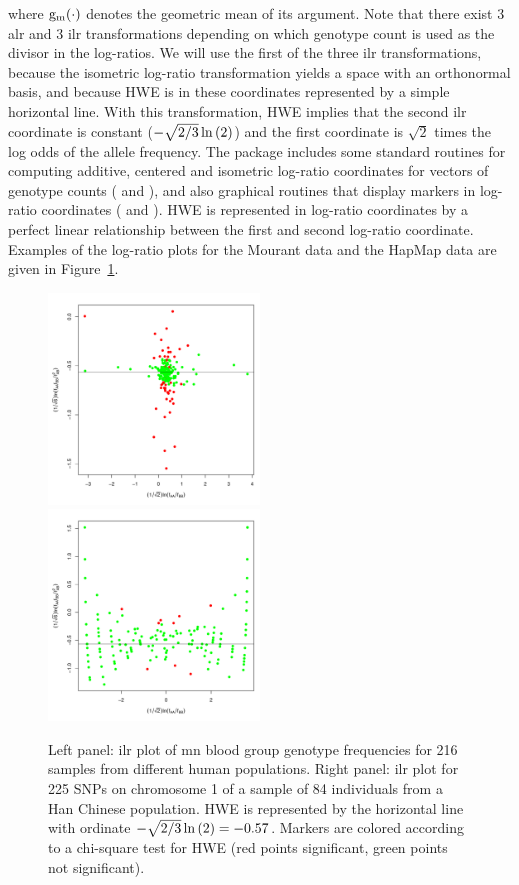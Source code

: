 \documentclass[nojss]{jss}
\begin{document}
where ${\mathrm{g_m}}(\cdot)$ denotes the geometric mean of its argument. Note
that there exist 3 alr and 3 ilr transformations depending on which
genotype count is used as the divisor in the log-ratios. We will use
the first of the three ilr transformations, because the isometric
log-ratio transformation yields a space with an orthonormal basis, and
because HWE is in these coordinates represented by a simple horizontal
line. With this transformation, HWE implies that the second ilr
coordinate is constant ($-\sqrt{2/3} \ln \left( 2 \right)$) and the first
coordinate is $\sqrt{2}$ times the log odds of the allele frequency.
The package includes some standard routines for computing additive,
centered and isometric log-ratio coordinates for vectors of genotype
counts ( and ), and also graphical
routines that display markers in log-ratio coordinates
( and ).  HWE is
represented in log-ratio coordinates by a perfect linear relationship
between the first and second log-ratio coordinate. Examples of the
log-ratio plots for the Mourant data and the HapMap data are given in
Figure~\ref{fig:logratio}.

\begin{figure}[t!]
\centering
\includegraphics[width=0.5\textwidth, trim=0 10 0 20, clip]{HWHapMapIlr1.pdf}%
\includegraphics[width=0.5\textwidth, trim=0 10 0 20, clip]{HWHapMapIlr2.pdf}
\caption{Left panel: ilr plot of {\sc mn} blood group genotype
  frequencies for 216 samples from different human populations. Right
  panel: ilr plot for 225 SNPs on chromosome 1 of a sample of 84
  individuals from a Han Chinese population. HWE is represented by the
  horizontal line with ordinate $-\sqrt{2/3}\ln \left( 2 \right) = -0.57$. Markers
  are colored according to a chi-square test for HWE (red points
  significant, green points not significant).}\label{fig:logratio}
\end{figure}
\end{document}
